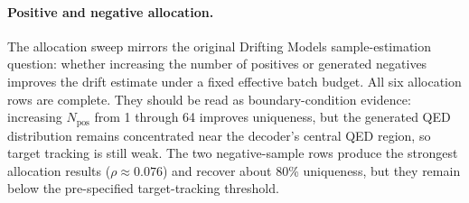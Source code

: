 \begin{table}[!h]
\centering
\caption{Strict faithful-Drifting core runs. These rows use the Algorithm-2
drift field without decoder-coupled drift or diversity regularization.}
\label{tab:supp-faithful-core}
\end{table}

\paragraph{Positive and negative allocation.}
The allocation sweep mirrors the original Drifting Models sample-estimation
question: whether increasing the number of positives or generated negatives
improves the drift estimate under a fixed effective batch budget. All six
allocation rows are complete. They should be read as boundary-condition
evidence: increasing $N_{\mathrm{pos}}$ from 1 through 64 improves uniqueness,
but the generated QED distribution remains concentrated near the decoder's
central QED region, so target tracking is still weak. The two negative-sample
rows produce the strongest allocation results ($\rho\approx0.076$) and recover
about 80\% uniqueness, but they remain below the pre-specified target-tracking
threshold.

